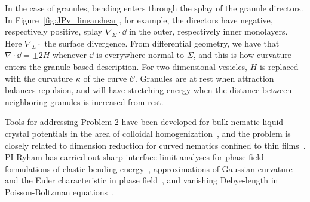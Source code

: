 In the case of granules, bending enters through the
splay of the granule directors. In
Figure~\ref{fig:JPv_linearshear}, for example, the directors have
negative, respectively positive, splay $\nabla_{\Sigma} \cdot \dd$ in
the outer, respectively inner monolayers. Here $\nabla_{\Sigma}\cdot{}$
the surface divergence. From differential
geometry, we have that $\nabla\cdot \dd = \pm 2H$ whenever $\dd$ is
everywhere normal to $\Sigma$, and this is how curvature enters
the granule-based description.  For two-dimensional vesicles,
$H$ is replaced with the curvature $\kappa$ of the curve $\mathcal{C}$.
Granules are at rest when attraction balances repulsion, and will have
stretching energy when the distance between neighboring granules is increased
from rest.

Tools for addressing Problem 2 have been developed for bulk nematic
liquid crystal potentials in the area of colloidal
homogenization~\cite{Canevari2019DesignOE, doi:10.1137/18M1163919,
BERLYAND200597, doi:10.1137/130910348}, and the problem is closely
related to dimension reduction for curved nematics confined to thin
films~\cite{Golovaty2017DimensionRF, Golovaty2015DimensionRF,
doi:10.1142/S0218202516500470, FoFrLe07}.  PI Ryham has carried out
sharp interface-limit analyses for phase field formulations of elastic
bending energy~\cite{0951-7715-18-3-016, Du05}, approximations of
Gaussian curvature and the Euler characteristic in phase
field~\cite{DuEuler}, and vanishing Debye-length in Poisson-Boltzman
equations~\cite{Lee2018, 1531-3492_2006_2_357}.

